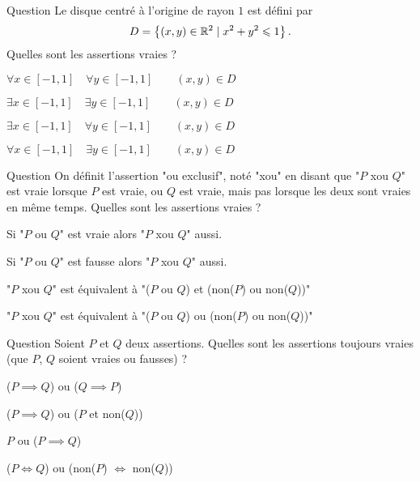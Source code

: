 \begin{multi}[multiple,feedback=
{Faire un dessin permet de mieux comprendre la situation !
}]{Question}
Le disque centré à l'origine de rayon \(1\) est défini par 
\[D = \left\{ (x,y) \in \mathbb{R}^2 \mid x^2+y^2 \leqslant 1\right\}.\]
Quelles sont les assertions vraies ?

    \item \(\forall x \in [-1,1] \quad \forall y \in [-1,1] \qquad (x,y) \in D\)
    \item* \(\exists x \in [-1,1] \quad \exists y \in [-1,1] \qquad (x,y) \in D\)
    \item* \(\exists x \in [-1,1] \quad \forall y \in [-1,1] \qquad (x,y) \in D\)
    \item* \(\forall x \in [-1,1] \quad \exists y \in [-1,1] \qquad (x,y) \in D\)
\end{multi}


\begin{multi}[multiple,feedback=
{Commencer par faire la table de vérité de "\(P\) ou \(Q\)".
}]{Question}
On définit l'assertion "ou exclusif", noté "xou" en disant que "\(P\) xou \(Q\)" est vraie lorsque \(P\) est vraie, ou \(Q\) est vraie, mais pas lorsque les deux sont vraies en même temps. Quelles sont les assertions vraies ?

    \item Si "\(P\) ou \(Q\)" est vraie alors "\(P\) xou \(Q\)" aussi.
    \item* Si "\(P\) ou \(Q\)" est fausse alors "\(P\) xou \(Q\)" aussi.
    \item* "\(P\) xou \(Q\)" est équivalent à "(\(P\) ou \(Q\)) et (non(\(P\)) ou non(\(Q\)))"
    \item "\(P\) xou \(Q\)" est équivalent à "(\(P\) ou \(Q\)) ou (non(\(P\)) ou non(\(Q\)))"
\end{multi}


\begin{multi}[multiple,feedback=
{Tester les quatre possibilités selon que \(P,Q\) sont vraies ou fausses.
}]{Question}
Soient \(P\) et \(Q\) deux assertions. Quelles sont les assertions toujours vraies (que \(P\), \(Q\) soient vraies ou fausses)  ?

    \item* (\(P \implies Q\)) ou (\(Q \implies P\))
    \item* (\(P \implies Q\)) ou (\(P\) et non(\(Q\)))
    \item* \(P\) ou (\(P \implies Q\))
    \item (\(P \iff Q\)) ou (non(\(P\)) \(\iff\) non(\(Q\)))
\end{multi}


